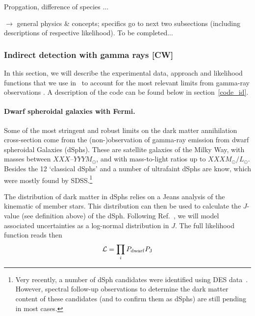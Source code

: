 \medskip


Propgation, difference of species ...

\medskip


$\to$ general physics \& concepts; specifics go to next two subsections 
(including descriptions of respective likelihood).
{\color{red} To be completed...}
\smallskip



\subsubsection{Indirect detection with gamma rays {\bf [CW]}}
\label{phys_ga}

In this section, we will describe the experimental data, approach and
likelihood functions that we use in \GB\ to account for the most relevant
limits from gamma-ray observations .  A description of the code can be found
below in section~\ref{code_id}.

\paragraph{Dwarf spheroidal galaxies with Fermi.}
Some of the most stringent and robust limits on the dark matter annihilation
cross-section come from the (non-)observation of gamma-ray emission from dwarf
spheroidal Galaxies (dSphs).  These are satellite galaxies of the Milky Way,
with masses between $XXX$--$YYY M_\odot$, and with mass-to-light ratios up to
$XXX M_\odot/L_\odot$.  Besides the 12 `classical dSphs' and a number of
ultrafaint dSphs are know, which were mostly found by SDSS.\footnote{Very
recently, a number of dSph candidates were identified using DES
data~\cite{123}.  However, spectral follow-up observations to
determine the dark matter content of these candidates (and to
confirm them as dSphs) are still pending in most cases.}  

The distribution of dark matter in dSphs relies on a Jeans analysis of the
kinematic of member stars.  This distribution can then be used to calculate the
$J$-value (see definition above) of the dSph.  Following
Ref.~\cite{FermiDwarfs}, we will model associated uncertainties as a log-normal
distribution in $J$.  The full likelihood function reads then
%
\begin{equation}
  \mathcal{L} = \prod_i P_{\rm dwarf} P_{\rm J}
\end{equation}
%

